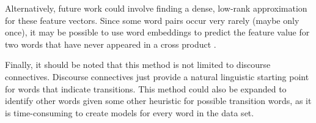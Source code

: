 \documentclass[11pt,letterpaper]{article}
\begin{document}
Alternatively, future work could involve finding a dense, low-rank approximation for these feature vectors.
Since some word pairs occur very rarely (maybe only once), it may be possible to use word embeddings to
predict the feature value for two words that have never appeared in a cross product \cite{Mikolov}.

Finally, it should be noted that
this method is not limited to discourse connectives.
Discourse connectives just provide a natural linguistic starting point
for words that indicate transitions.
This method could also be expanded to identify other words given some other
heuristic for possible transition words, as it is time-consuming to create
models for every word in the data set.

\end{document}
